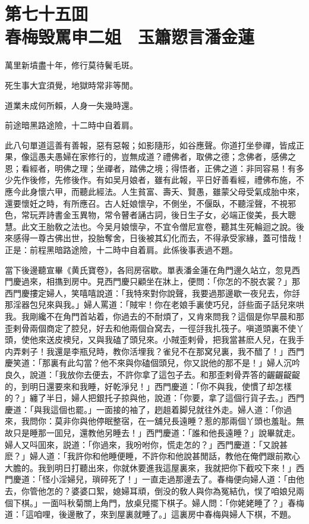 
\chapter*{第七十五囬　\\春梅毁罵申二姐　玉簫愬言潘金蓮}


\begin{myquote}
萬里新墳盡十年，修行莫待鬢毛斑。

死生事大宜須覺，地獄時常非等閒。

道業未成何所賴，人身一失幾時還。

前途暗黑路途險，十二時中自着肩。
\end{myquote}

此八句單道這善有善報，惡有惡報；如影隨形，如谷應聲。你道打坐參禪，皆成正果，像這愚夫愚婦在家修行的，豈無成道？禮佛者，取佛之德；念佛者，感佛之恩；看經者，明佛之理；坐禪者，踏佛之境；得悟者，正佛之道：非同容易！有多少先作後修，先修後作。有如吴月娘者，雖有此報，平日好善看經，禮佛布施，不應今此身懷六甲，而聽此經法。人生貧富、壽夭、賢愚，雖蒙父母受氣成胎中來，還要懷妊之時，有所應召。古人妊娘懷孕，不側坐，不偃臥，不聽淫聲，不視邪色，常玩弄詩書金玉異物，常令瞽者誦古詞，後日生子女，必端正俊美，長大聰慧。此文王胎敎之法也。今吴月娘懷孕，不宜令僧尼宣卷，聽其生死輪迴之說。後來感得一尊古佛出世，投胎奪舍，日後被其幻化而去，不得承受家緣，蓋可惜哉！正是：前程黑暗路途險，十二時中自着肩。此係後事表過不題。

當下後邊聽宣畢《黄氏寶卷》，各囘房宿歇。單表潘金蓮在角門邊久站立，忽見西門慶過來，相㩦到房中。見西門慶只顧坐在牀上，便問：「你怎的不脱衣裳？」那西門慶摟定婦人，笑嘻嘻說道：「我特來對你說聲，我要過那邊歇一夜兒去，你㧱那淫器包兒來與我。」婦人罵道：「賊牢！你在老娘手裏使巧兒，㧱些面子話兒來哄我。我剛纔不在角門首站着，你過去的不耐煩了，又肯來問我？這個是你早晨和那歪剌骨兩個商定了腔兒，好去和他兩個㒲窝去，一徑㧱我扎筏子。嗔道頭裏不使丫頭，使他來送皮襖兒，又與我磕了頭兒來。小賊歪剌骨，把我當甚麽人兒，在我手内弄剌子！我還是李瓶兒時，教你活埋我？雀兒不在那窝兒裏，我不醋了！」西門慶笑道：「那裏有此勾當？他不來與你磕個頭兒，你又説他的那不是！」婦人沉吟良久，說道：「我放你去便去，不許你拿了這包子去。和那歪剌骨弄答的齷齷齪齪的，到明日還要來和我睡，好乾淨兒！」西門慶道：「你不與我，使慣了却怎樣的？」纏了半日，婦人把銀托子掠與他，說道：「你要，拿了這個行貨子去。」西門慶道：「與我這個也罷。」一面接的袖了，趔趄着脚兒就往外走。婦人道：「你過來，我問你：莫非你與他停眠整宿，在一舖兒長遠睡？惹的那兩個丫頭也羞耻。無故只是睡那一囬兒，還教他另睡去！」西門慶道：「誰和他長遠睡？」說畢就走。婦人又呌囬來，説道：「你過來，我吩咐你，慌走怎的？」西門慶道：「又說甚麽？」婦人道：「我許你和他睡便睡，不許你和他說甚閒話，教他在俺們跟前欺心大膽的。我到明日打聽出來，你就休要進我這屋裏來，我就把你下截咬下來！」西門慶道：「怪小淫婦兒，瑣碎死了！」一直走過那邊去了。春梅便向婦人道：「由他去，你管他怎的？婆婆口絮，媳婦耳頑，倒没的敎人與你為冤結仇，悮了咱娘兒兩個下棋。」一面呌秋菊關上角門，放桌兒擺下棋子。婦人問：「你姥姥睡了？」春梅道：「這咱哩，後邊散了，來到屋裏就睡了。」這裏房中春梅與婦人下棋，不題。

